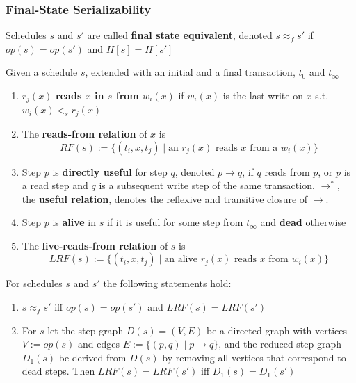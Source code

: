 \documentclass[11pt]{article}
\begin{document}
\subsubsection{Final-State Serializability}
\label{sec:orga33717a}
\begin{definition}[]
Schedules \(s\) and \(s'\) are called \textbf{final state equivalent}, denoted \(s\approx_fs'\)
if \(op(s)=op(s')\) and \(H[s]=H[s']\)
\end{definition}

\begin{definition}
Given a schedule \(s\), extended with an initial and a final transaction, \(t_0\)
and \(t_\infty\)
\begin{enumerate}
\item \(r_j(x)\) \textbf{reads \(x\) in \(s\) from \(w_i(x)\)} if \(w_i(x)\) is the last write on \(x\)
s.t. \(w_i(x)<_sr_j(x)\)
\item The \textbf{reads-from relation} of \(x\) is
\begin{equation*}
RF(s):=\{(t_i,x,t_j)\mid \text{an }r_j(x)\text{ reads \(x\) from a }w_i(x)\}
\end{equation*}
\item Step \(p\) is \textbf{directly useful} for step \(q\), denoted \(p\to q\), if \(q\) reads from \(p\),
or \(p\) is a read step and \(q\) is a subsequent write step of the same
transaction. \(\to^*\), the \textbf{useful relation}, denotes the reflexive and transitive closure of \(\to\).
\item Step \(p\) is \textbf{alive} in \(s\) if it is useful for some step from \(t_\infty\) and \textbf{dead}
otherwise
\item The \textbf{live-reads-from relation} of \(s\) is
\begin{equation*}
LRF(s):=\{(t_i,x,t_j)\mid \text{an alive \(r_j(x)\) reads \(x\) from \(w_i(x)\)}\}
\end{equation*}
\end{enumerate}
\end{definition}

\begin{theorem}[]
For schedules \(s\) and \(s'\) the following statements hold:
\begin{enumerate}
\item \(s\approx_fs'\) iff \(op(s)=op(s')\) and \(LRF(s)=LRF(s')\)
\item For \(s\) let the step graph \(D(s)=(V,E)\) be a directed graph with vertices \(V:=op(s)\)
and edges \(E:=\{(p,q)\mid p\to q\}\), and the reduced step graph \(D_1(s)\) be derived
from \(D(s)\) by removing all vertices that correspond to dead steps. Then \(LRF(s)=LRF(s')\)
iff \(D_1(s)=D_1(s')\)
\end{enumerate}
\end{theorem}
\end{document}

